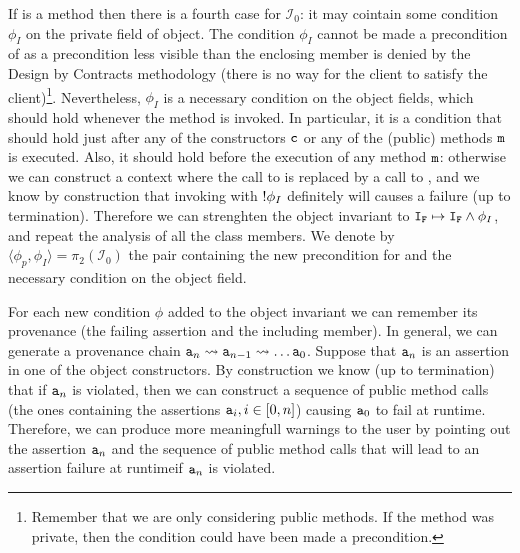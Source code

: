 \documentclass{llncs}
\begin{document}
If  is a method then there is a fourth case for $\mathcal{I}_0$: it may cointain some condition $\phi_I$ on the private field of  object.
The condition $\phi_I$ cannot be made a precondition of  as a precondition less visible than the enclosing member is denied by the Design by Contracts methodology (there is no way for the client to satisfy the client)\footnote{Remember that we are only considering public methods. If the method was private, then the condition could have been made a precondition.}. 
Nevertheless, $\phi_I$ is a necessary condition on the object fields, which should hold whenever the method is invoked.
In particular, it is a condition that should hold just after any of the constructors $\mathtt{c}$ or any of the (public) methods $\mathtt{m}$ is executed.
Also, it should hold before the execution of any method $\mathtt{m}$: otherwise we can construct a context where the call to  is replaced by a call to , and we know by construction that invoking  with $\mathtt{!}\phi_I$ definitely will causes a failure (up to termination).
Therefore we can strenghten the object invariant to $\mathtt{I}_{\mathtt{F}} \mapsto \mathtt{I}_{\mathtt{F}} \wedge \phi_I$, and repeat the analysis of all the class members.
We denote by $\langle \phi_p, \phi_I \rangle = \pi_2(\mathcal{I}_0)$ the pair containing the new precondition for  and the necessary condition on the object field.

For each new condition  $\phi$ added to the object invariant we can remember its provenance (the failing assertion and the including member).
In general, we can generate a  provenance chain $\mathtt{a}_{n} \leadsto \mathtt{a}_{n-1}  \leadsto \dots  \mathtt{a}_0$.
Suppose that $\mathtt{a}_n$ is an assertion in one of the object constructors.
By construction we know (up to termination) that if $\mathtt{a}_n$ is violated, then we can construct a sequence of public method calls (the ones containing the assertions $\mathtt{a}_i, i \in [0, n]$) causing $\mathtt{a}_0$ to fail at runtime.
Therefore, we can produce more meaningfull warnings to the user by pointing out the assertion  $\mathtt{a}_{n}$ and the sequence of public method calls that will lead to an assertion failure at runtimeif $\mathtt{a}_n$ is violated.
\end{document}
